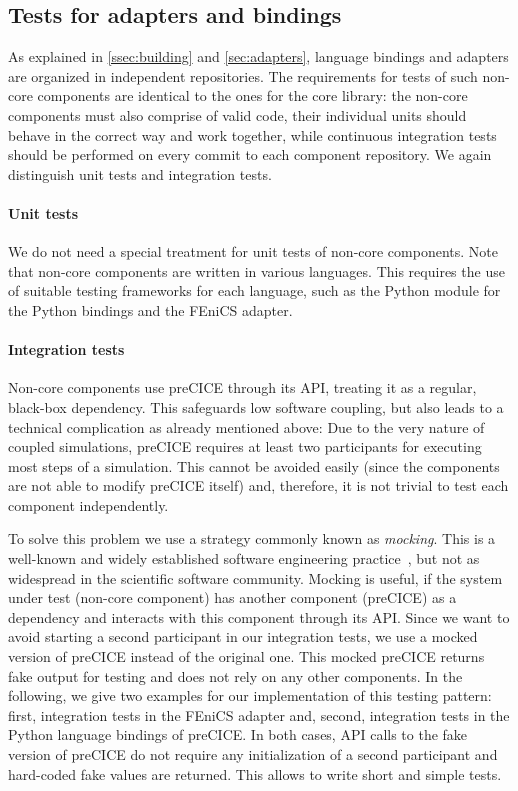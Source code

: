 \subsection{Tests for adapters and bindings}
\label{ssec:unit_and_integration_tests_other}

As explained in \autoref{ssec:building} and \autoref{sec:adapters}, language bindings and adapters are organized in independent repositories. The requirements for tests of such non-core components are identical to the ones for the core library: the non-core components must also comprise of valid code, their individual units should behave in the correct way and work together, while continuous integration tests should be performed on every commit to each component repository. We again distinguish unit tests and integration tests.

\paragraph{Unit tests} We do not need a special treatment for unit tests of non-core components. Note that non-core components are written in various languages. This requires the use of suitable testing frameworks for each language, such as the Python module  for the Python bindings and the FEniCS adapter.

\paragraph{Integration tests} Non-core components use preCICE through its API, treating it as a regular, black-box dependency. This safeguards low software coupling, but also leads to a technical complication as already mentioned above: Due to the very nature of coupled simulations, preCICE requires at least two participants for executing most steps of a simulation. This cannot be avoided easily (since the components are not able to modify preCICE itself) and, therefore, it is not trivial to test each component independently.

To solve this problem we use a strategy commonly known as \emph{mocking}. This is a well-known and widely established software engineering practice~\cite{fowler2007mocks}, but not as widespread in the scientific software community. Mocking is useful, if the system under test (non-core component) has another component (preCICE) as a dependency and interacts with this component through its API. Since we want to avoid starting a second participant in our integration tests, we use a mocked version of preCICE instead of the original one. This mocked preCICE returns fake output for testing and does not rely on any other components.
In the following, we give two examples for our implementation of this testing pattern: first, integration tests in the FEniCS adapter and, second, integration tests in the Python language bindings of preCICE. In both cases, API calls to the fake version of preCICE do not require any initialization of a second participant and hard-coded fake values are returned. This allows to write short and simple tests.


